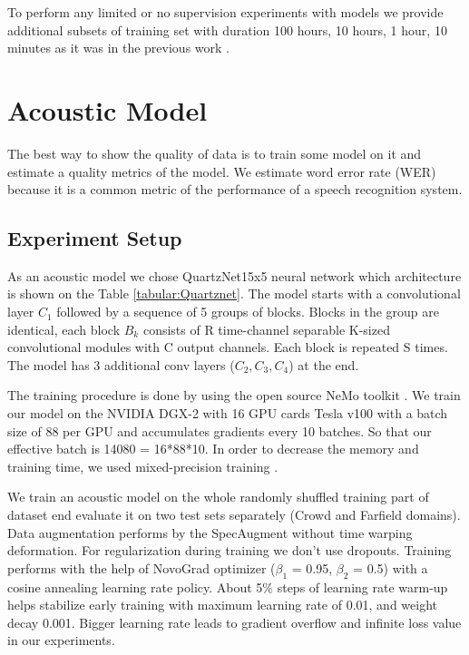 \documentclass[a4paper]{article}
\begin{document}
To perform any limited  or  no  supervision experiments with models we provide additional subsets of training set with duration 100 hours, 10 hours, 1 hour, 10 minutes as it was in the previous work \cite{kahn2020libri}.

\section{Acoustic Model}

The best way to show the quality of data is to train some model on it and estimate a quality metrics of the model. We estimate word error rate (WER) because it is a common metric of the performance of a speech recognition system. 

\subsection{Experiment Setup}

As an acoustic model we chose QuartzNet15x5 neural network \cite{kriman2020quartznet} which architecture is shown on the Table \ref{tabular:Quartznet}. The model starts with a convolutional layer $C_1$ followed by a sequence of 5 groups of blocks. Blocks in the group are identical, each block $B_k$ consists of R time-channel separable K-sized convolutional modules with C output channels. Each block is repeated S times. The model has 3 additional conv layers ($C_2, C_3, C_4$) at the end.

The training procedure is done by using the open source NeMo toolkit \cite{kuchaiev2019nemo}. We train our model on the NVIDIA DGX-2 with 16 GPU cards Tesla v100 with a batch size of 88 per GPU and accumulates gradients every 10 batches. So that our effective batch is 14080 = 16*88*10. In order to decrease the memory and training time, we used mixed-precision training \cite{micikevicius2017mixed}.

We train an acoustic model on the whole randomly shuffled training part of dataset end evaluate it on two test sets separately (Crowd and Farfield domains). Data augmentation performs by the SpecAugment \cite{park2019specaugment} without time warping deformation. For regularization during training we don't use dropouts. Training performs with the help of NovoGrad \cite{ginsburg2019stochastic} optimizer ($\beta_1$ = 0.95, $\beta_2$ = 0.5) with a cosine annealing learning rate policy. About 5\% steps of learning rate warm-up helps stabilize early training with maximum learning rate of 0.01, and weight decay 0.001. Bigger learning rate leads to gradient overflow and infinite loss value in our experiments. 
\end{document}
